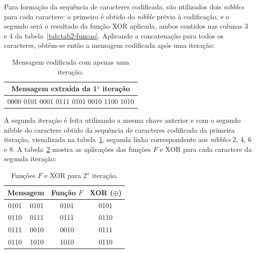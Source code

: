 \documentclass[a4paper,pra,aps,twocolumn,superscriptaddress,10pt,final]{revtex4-2}
\begin{document}
    Para formação da sequência de caracteres codificada, são utilizados dois \textit{nibbles} para cada caractere: o primeiro é obtido do \textit{nibble} prévio à codificação, e o segundo será o resultado da função XOR aplicada, ambos contidos nas colunas 3 e 4 da tabela~\ref{tab:tab2-funcao}. Aplicando a concatenação para todos os caracteres, obtêm-se então a mensagem codificada após uma iteração:

    \begin{table}[!htpb]
        \caption{Mensagem codificada com apenas uma iteração.}
        \label{tab:tab3-iter1}
        \begin{tabular}{|c|}
        \hline
        \textbf{Mensagem extraída da 1$^{\text{a}}$ iteração}  \\ \hline
        0000 0101 0001 0111 0101 0010 1100 1010     \\ \hline
        \end{tabular}%
    \end{table}
    
    A segunda iteração é feita utilizando a mesma chave anterior e com o segundo nibble do caractere obtido da sequência de caracteres codificada da primeira iteração, visualizada na tabela~\ref{tab:tab3-iter1}, segunda linha correspondente aos \textit{nibbles} 2, 4, 6 e 8. A tabela~\ref{tab:tab4-funcao} mostra as aplicações das funções $F$ e XOR para cada caractere da segunda iteração:

    \begin{table}[!htpb]
        \caption{Funções $F$ e XOR para $2^a$ iteração.}
        \label{tab:tab4-funcao}
        \begin{tabular}{|cc|c|c|}
        \hline
        \multicolumn{2}{|c|}{\textbf{Mensagem}} & \textbf{Função $F$} & \textbf{XOR ($\oplus$)} \\ \hline
        \multicolumn{1}{|c|}{0101}    & 0101    & 0101                & 0101                                 \\ \hline
        \multicolumn{1}{|c|}{0110}    & 0111    & 0111                & 0110                                 \\ \hline
        \multicolumn{1}{|c|}{0111}    & 0010    & 0010                & 0111                                 \\ \hline
        \multicolumn{1}{|c|}{0110}    & 1010    & 1010                & 0110                                 \\ \hline
        \end{tabular}
    \end{table}
\end{document}
